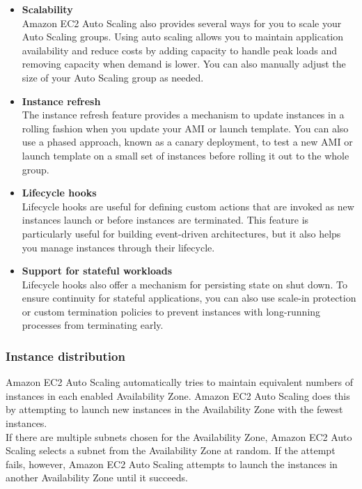 \documentclass[12pt, letterpaper, twoside]{article}
\begin{document}
\begin{itemize}
	\item \textbf{Scalability}\\
	Amazon EC2 Auto Scaling also provides several ways for you to scale your Auto Scaling groups. Using auto scaling 
	allows you to maintain application availability and reduce costs by adding capacity to handle peak loads and 
	removing capacity when demand is lower. You can also manually adjust the size of your Auto Scaling group as 
	needed.

	\item \textbf{Instance refresh}\\
	The instance refresh feature provides a mechanism to update instances in a rolling fashion when you update your 
	AMI or launch template. You can also use a phased approach, known as a canary deployment, to test a new AMI or 
	launch template on a small set of instances before rolling it out to the whole group.

	\item \textbf{Lifecycle hooks}\\
	Lifecycle hooks are useful for defining custom actions that are invoked as new instances launch or before instances 
	are terminated. This feature is particularly useful for building event-driven architectures, but it also helps you 
	manage instances through their lifecycle.

	\item \textbf{Support for stateful workloads}\\
	Lifecycle hooks also offer a mechanism for persisting state on shut down. To ensure continuity for stateful 
	applications, you can also use scale-in protection or custom termination policies to prevent instances with 
	long-running processes from terminating early.
\end{itemize}

\subsubsection{Instance distribution}
Amazon EC2 Auto Scaling automatically tries to maintain equivalent numbers of instances in each enabled Availability 
Zone. Amazon EC2 Auto Scaling does this by attempting to launch new instances in the Availability Zone with the 
fewest instances.\\
If there are multiple subnets chosen for the Availability Zone, Amazon EC2 Auto Scaling selects a subnet from the 
Availability Zone at random. If the attempt fails, however, Amazon EC2 Auto Scaling attempts to launch the instances 
in another Availability Zone until it succeeds.\\
\end{document}
